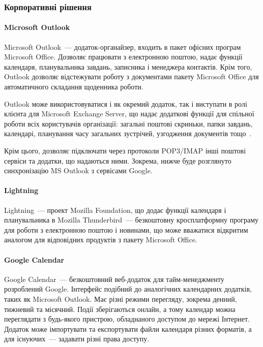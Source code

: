 \subsubsection{Корпоративні рішення}

\paragraph{Microsoft Outlook}

Microsoft Outlook~--- додаток-органайзер, входить в пакет офісних програм Microsoft Office. Дозволяє працювати з електронною поштою, надає функції календаря, планувальника завдань, записника і менеджера контактів. Крім того, Outlook дозволяє відстежувати роботу з документами пакету Microsoft Office для автоматичного складання щоденника роботи.

Outlook може використовуватися  і як окремий додаток, так і виступати в ролі клієнта для Microsoft Exchange Server, що надає додаткові функції для спільної роботи всіх користувачів організації: загальні поштові скриньки, папки завдань, календарі, планування часу загальних зустрічей, узгодження документів тощо~\cite{rutledge2015}.

Крім цього, дозволяє підключати через протоколи POP3/IMAP інші поштові сервіси та додатки, що надаються ними. Зокрема, нижче буде розглянуто синхронізацію MS Outlook з сервісами Google.

\paragraph{Lightning}

Lightning~--- проект Mozilla Foundation, що додає функції календаря і планувальника в Mozilla Thunderbird~--- безкоштовну кросплатформну програму для роботи з електронною поштою і новинами, що може вважатися відкритим аналогом для відповідних продуктів з пакету Microsoft Office.

\paragraph{Google Calendar}

Google Calendar~--- безкоштовний веб-додаток для тайм-менеджменту розроблений Google. Інтерфейс подібний до аналогічних календарних додатків, таких як Microsoft Outlook. Має різні режими перегляду, зокрема денний, тижневий та місячний. Події зберігаються онлайн, а тому календар можна переглядати з будь-якого пристрою, обладнаного доступом до мережі Інтернет. Додаток може імпортувати та експортувати файли календаря різних форматів, а для існуючих~--- задавати різні права доступу. 

